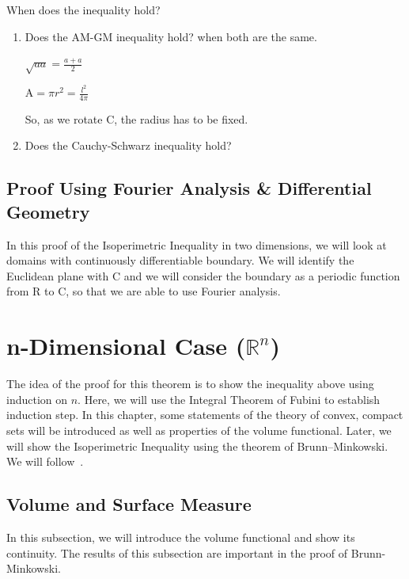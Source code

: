 \documentclass[a4paper]{book}
\numberwithin{theorem}{section}%
\begin{document}
When does the inequality hold?
\begin{enumerate}
    \item Does the AM-GM inequality hold? when both are the same.
    \begin{center}
        $\sqrt{aa}=\frac{a+a}{2}$

        $\mathrm{A}=\pi r^{2}=\frac{l^{2}}{4\pi}$
    \end{center}

    So, as we rotate $\mathrm{C}$, the radius has to be fixed.

    \item Does the Cauchy-Schwarz inequality hold?
\end{enumerate}

\section{Proof Using Fourier Analysis {\&} Differential Geometry}
In this proof of the Isoperimetric Inequality in two dimensions, we will look at domains
with continuously differentiable boundary. We will identify the Euclidean plane with $\mathrm{C}$
and we will consider the boundary as a periodic function from $\mathrm{R}$ to $\mathrm{C}$, so that we are able
to use Fourier analysis. 

\chapter{n-Dimensional Case ($\mathbb{R}^n$)}
The idea of the proof for this theorem is to show the inequality above using induction on $n$. Here, we will use the Integral Theorem of Fubini to establish induction step. In this chapter, some statements of the theory of convex, compact sets will be introduced as well as properties of the volume functional. Later, we will show the Isoperimetric Inequality using the theorem of Brunn–Minkowski. We will follow~\citep{schneider2014convex}.

\section{Volume and Surface Measure}
In this subsection, we will introduce the volume functional and show its continuity. The results of this subsection are important in the proof of Brunn-Minkowski.
\end{document}
